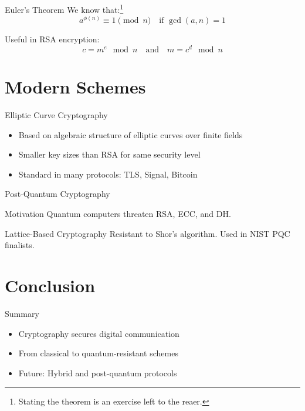 \documentclass{beamer}
\begin{document}
\begin{frame}{Euler’s Theorem}
We know that:\footnote{Stating the theorem is an exercise left to the reaer.}
\[
a^{\phi(n)} \equiv 1 \pmod{n} \quad \text{if } \gcd(a,n)=1
\]

\pause

Useful in RSA encryption:
\[
c = m^e \mod n \quad\text{and}\quad m = c^d \mod n
\]
\end{frame}

\section{Modern Schemes}

\begin{frame}{Elliptic Curve Cryptography}
\begin{itemize}
\item Based on algebraic structure of elliptic curves over finite fields
\item Smaller key sizes than RSA for same security level
\item Standard in many protocols: TLS, Signal, Bitcoin
\end{itemize}
\end{frame}

\begin{frame}{Post-Quantum Cryptography}
\begin{alertblock}{Motivation}
Quantum computers threaten RSA, ECC, and DH.
\end{alertblock}

\begin{exampleblock}{Lattice-Based Cryptography}
Resistant to Shor's algorithm. Used in NIST PQC finalists.
\end{exampleblock}
\end{frame}

\section{Conclusion}

\begin{frame}{Summary}
\begin{itemize}
\item Cryptography secures digital communication
\item From classical to quantum-resistant schemes
\item Future: Hybrid and post-quantum protocols
\end{itemize}
\end{frame}
\end{document}
